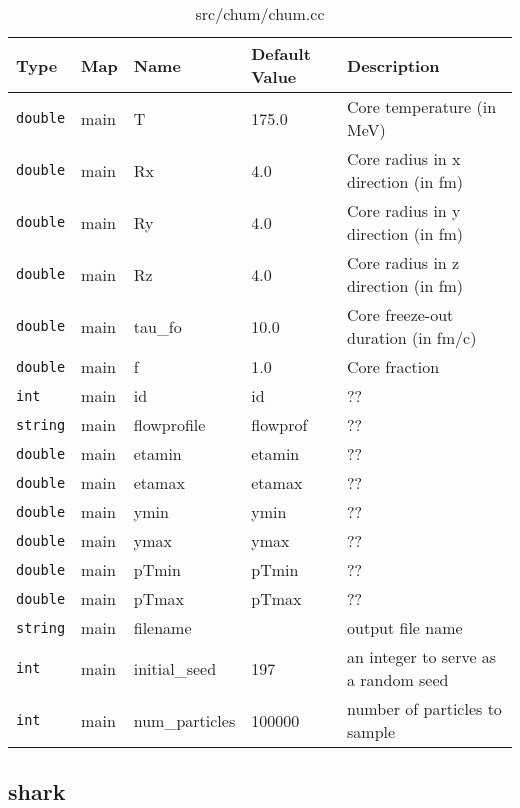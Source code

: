 \documentclass[10pt]{article}
\begin{document}
        \begin{table}
            \begin{tabular}{lllll}
                \hline\hline
                Type & Map & Name & Default Value & Description \\
                \hline\hline 
                {\tt double} & main & T & 175.0 & Core temperature (in MeV)\\\hline
                {\tt double} & main & Rx & 4.0 & Core radius in x direction (in fm)\\\hline
                {\tt double} & main & Ry & 4.0 & Core radius in y direction (in fm)\\\hline
                {\tt double} & main & Rz & 4.0 & Core radius in z direction (in fm)\\\hline
                {\tt double} & main & tau\_fo & 10.0 & Core freeze-out duration (in fm/c)\\\hline
                {\tt double} & main & f & 1.0 & Core fraction\\\hline
                {\tt int} & main & id & id & ??\\\hline
                {\tt string} & main & flowprofile & flowprof & ??\\\hline
                {\tt double} & main & etamin & etamin & ??\\\hline
                {\tt double} & main & etamax & etamax & ??\\\hline
                {\tt double} & main & ymin & ymin & ??\\\hline
                {\tt double} & main & ymax & ymax & ??\\\hline
                {\tt double} & main & pTmin & pTmin & ??\\\hline
                {\tt double} & main & pTmax & pTmax & ??\\\hline
                {\tt string} & main & filename &  & output file name\\\hline
                {\tt int} & main & initial\_seed & 197 & an integer to serve as a random seed\\\hline
                {\tt int} & main & num\_particles & 100000 & number of particles to sample\\\hline
            \end{tabular}
            \caption{ src/chum/chum.cc }
        \end{table}


\subsection{shark}
\end{document}
